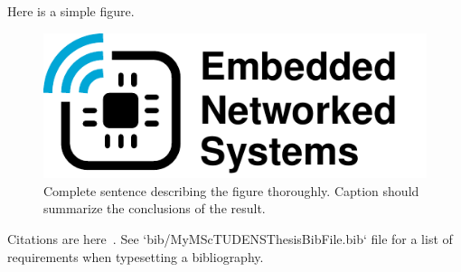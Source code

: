 Here is a simple figure.

\begin{figure}[t]
\includegraphics[width=\textwidth]{template-pics/tud-ens-logo-tikz/tud-ens-logo}
\caption{Complete sentence describing the figure thoroughly. Caption should summarize the conclusions of the result.}
\label{fig:example-figure}
\end{figure}

Citations are here~\cite{polastre2004analysis,powercast_website,hester2016persistent,schaper_msc_thesis_2017,dementyev_uist_2016}. See `bib/MyMScTUDENSThesisBibFile.bib` file for a list of requirements when typesetting a bibliography.